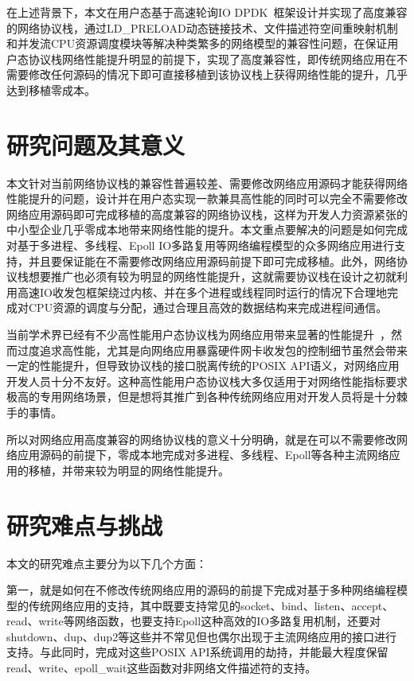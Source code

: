 在上述背景下，本文在用户态基于高速轮询IO DPDK~\cite{DPDK}框架设计并实现了高度兼容的网络协议栈，通过LD\_PRELOAD动态链接技术、文件描述符空间重映射机制和并发流CPU资源调度模块等解决种类繁多的网络模型的兼容性问题，在保证用户态协议栈网络性能提升明显的前提下，实现了高度兼容性，即传统网络应用在不需要修改任何源码的情况下即可直接移植到该协议栈上获得网络性能的提升，几乎达到移植零成本。

\section{研究问题及其意义}
\label{sec:01_problem_intro}
本文针对当前网络协议栈的兼容性普遍较差、需要修改网络应用源码才能获得网络性能提升的问题，设计并在用户态实现一款兼具高性能的同时可以完全不需要修改网络应用源码即可完成移植的高度兼容的网络协议栈，这样为开发人力资源紧张的中小型企业几乎零成本地带来网络性能的提升。本文重点要解决的问题是如何完成对基于多进程、多线程、Epoll IO多路复用等网络编程模型的众多网络应用进行支持，并且要保证能在不需要修改网络应用源码前提下即可完成移植。此外，网络协议栈想要推广也必须有较为明显的网络性能提升，这就需要协议栈在设计之初就利用高速IO收发包框架绕过内核、并在多个进程或线程同时运行的情况下合理地完成对CPU资源的调度与分配，通过合理且高效的数据结构来完成进程间通信。

当前学术界已经有不少高性能用户态协议栈为网络应用带来显著的性能提升~\cite{mTCP,IX,ZygOS}，然而过度追求高性能，尤其是向网络应用暴露硬件网卡收发包的控制细节虽然会带来一定的性能提升，但导致协议栈的接口脱离传统的POSIX API语义，对网络应用开发人员十分不友好。这种高性能用户态协议栈大多仅适用于对网络性能指标要求极高的专用网络场景，但是想将其推广到各种传统网络应用对开发人员将是十分棘手的事情。

所以对网络应用高度兼容的网络协议栈的意义十分明确，就是在可以不需要修改网络应用源码的前提下，零成本地完成对多进程、多线程、Epoll等各种主流网络应用的移植，并带来较为明显的网络性能提升。

\section{研究难点与挑战}
\label{sec:01_difficulties_and_chanllenge}
本文的研究难点主要分为以下几个方面：

第一，就是如何在不修改传统网络应用的源码的前提下完成对基于多种网络编程模型的传统网络应用的支持，其中既要支持常见的socket、bind、listen、accept、read、write等网络函数，也要支持Epoll这种高效的IO多路复用机制，还要对shutdown、dup、dup2等这些并不常见但也偶尔出现于主流网络应用的接口进行支持。与此同时，完成对这些POSIX API系统调用的劫持，并能最大程度保留read、write、epoll\_wait这些函数对非网络文件描述符的支持。

